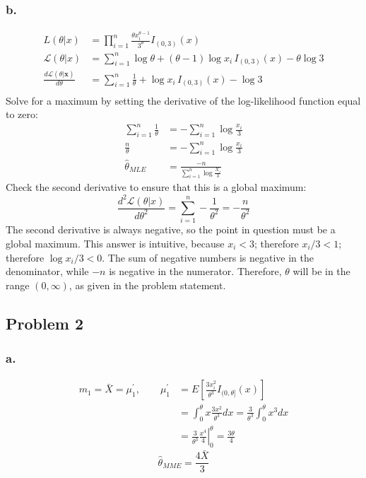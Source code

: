 \documentclass{article}
\begin{document}
\subsubsection*{b.}
\begin{align*}
L(\theta|x)&=\prod_{i=1}^n\frac{\theta x_i^{\theta-1}}{3^\theta}I_{(0,3)}(x) \\
\mathcal{L}(\theta|x)&=\sum_{i=1}^n \log{\theta}+(\theta-1)\log{x_i}\,I_{(0,3)}(x)-\theta\log{3} \\
\frac{d\mathcal{L}(\theta|\mathbf{x})}{d\theta} &= \sum_{i=1}^n \frac{1}{\theta} + \log{x_i}\,I_{(0,3)}(x) - \log{3} \\
\end{align*}
Solve for a maximum by setting the derivative of the log-likelihood function equal to zero:
\begin{align*}
\sum_{i=1}^n \frac{1}{\theta} &= -\sum_{i=1}^{n}\log{\frac{x_i}{3}} \\
\frac{n}{\theta} &= -\sum_{i=1}^{n}\log{\frac{x_i}{3}} \\
\hat{\theta}_{MLE} &= \frac{-n}{\sum_{i=1}^{n}\log{\frac{X_i}{3}}}
\end{align*}
Check the second derivative to ensure that this is a global maximum:
\[\frac{d^2\mathcal{L}(\theta|x)}{d\theta^2} = \sum_{i=1}^n -\frac{1}{\theta^2} = -\frac{n}{\theta^2}\]
The second derivative is always negative, so the point in question must be a global maximum. This answer is intuitive, because $x_i<3$; therefore $x_i/3 < 1$; therefore $\log{x_i/3}<0$. The sum of negative numbers is negative in the denominator, while $-n$ is negative in the numerator. Therefore, $\theta$ will be in the range $(0,\infty)$, as given in the problem statement.

\subsection*{Problem 2}
\subsubsection*{a.}
\begin{align*}
m_1 = \bar{X}= \mu_1^\prime,\quad\quad\mu_1^\prime &= E\left[\frac{3x_i^2}{\theta^3}I_{(0,\theta]}(x)\right] \\
&=\int_0^\theta x\frac{3x^2}{\theta^3}dx = \frac{3}{\theta^3}\int^\theta_0x^3dx \\
&=\frac{3}{\theta^3}\left.\frac{x^4}{4}\right|^\theta_0 = \frac{3\theta}{4}
\end{align*}
\[\hat{\theta}_{MME} = \frac{4\bar{X}}{3}\]
\end{document}
